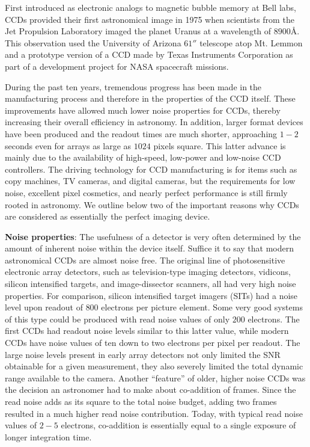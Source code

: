 \documentclass[a4paper,10pt]{article}
\begin{document}
{\noindent}First introduced as electronic analogs to magnetic bubble memory at Bell labs, CCDs provided their first astronomical image in 1975 when scientists from the Jet Propulsion Laboratory imaged the planet Uranus at a wavelength of $8900$\AA. This observation used the University of Arizona $61''$ telescope atop Mt. Lemmon and a prototype version of a CCD made by Texas Instruments Corporation as part of a development project for NASA spacecraft missions.

{\noindent}During the past ten years, tremendous progress has been made in the manufacturing process and therefore in the properties of the CCD itself. These improvements have allowed much lower noise properties for CCDs, thereby increasing their overall efficiency in astronomy. In addition, larger format devices have been produced and the readout times are much shorter, approaching $1-2$ seconds even for arrays as large as $1024$ pixels square. This latter advance is mainly due to the availability of high-speed, low-power and low-noise CCD controllers. The driving technology for CCD manufacturing is for items such as copy machines, TV cameras, and digital cameras, but the requirements for low noise, excellent pixel cosmetics, and nearly perfect performance is still firmly rooted in astronomy. We outline below two of the important reasons why CCDs are considered as essentially the perfect imaging device.

{\noindent}\textbf{Noise properties}: The usefulness of a detector is very often determined by the amount of inherent noise within the device itself. Suffice it to say that modern astronomical CCDs are almost noise free. The original line of photosensitive electronic array detectors, such as television-type imaging detectors, vidicons, silicon intensified targets, and image-dissector scanners, all had very high noise properties. For comparison, silicon intensified target imagers (SITs) had a noise level upon readout of $800$ electrons per picture element. Some very good systems of this type could be produced with read noise values of only $200$ electrons. The first CCDs had readout noise levels similar to this latter value, while modern CCDs have noise values of ten down to two electrons per pixel per readout. The large noise levels present in early array detectors not only limited the SNR obtainable for a given measurement, they also severely limited the total dynamic range available to the camera. Another ``feature'' of older, higher noise CCDs was the decision an astronomer had to make about co-addition of frames. Since the read noise adds as its square to the total noise budget, adding two frames resulted in a much higher read noise contribution. Today, with typical read noise values of $2-5$ electrons, co-addition is essentially equal to a single exposure of longer integration time.
\end{document}

